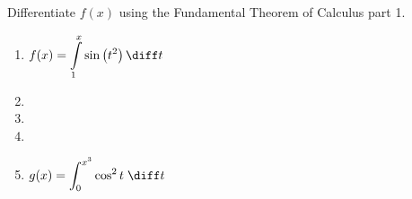 Differentiate $f(x)$ using the Fundamental Theorem of Calculus part 1.
\begin{multicols}{2}
\begin{enumerate}[ref={\fcProblemRef}]
\item $\displaystyle f(x) = \int\limits_1^x \sin \left(t^2\right)  \diff t$

\item 
\item 
\item 
\item ${\displaystyle g(x) = \int_{0}^{x^3} \cos^2 t \; \diff t}$


\end{enumerate}
\end{multicols}